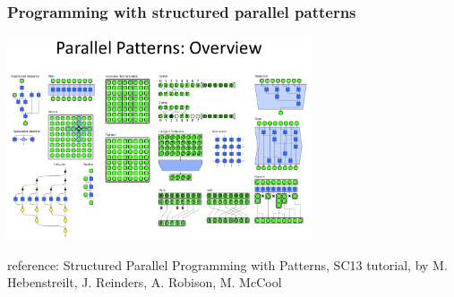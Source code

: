 \begin{frame}
  \frametitle{Programming with structured parallel patterns}

  \begin{center}
  \includegraphics[width=9cm]{images/parallel_patterns2}
  \end{center}

  {\scriptsize
  reference: Structured Parallel Programming with Patterns, SC13 tutorial, by M. Hebenstreilt, J. Reinders, A. Robison, M. McCool}

\end{frame}
